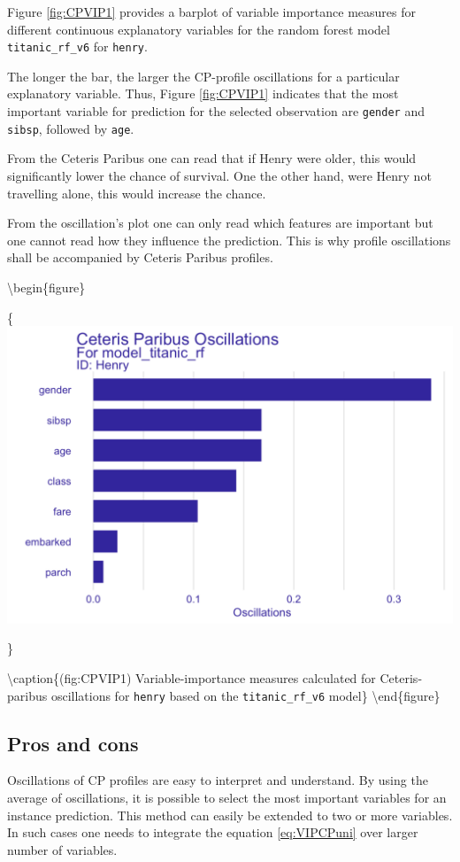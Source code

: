 \documentclass[12pt,]{krantz}
\begin{document}
Figure \ref{fig:CPVIP1} provides a barplot of variable importance measures for different continuous explanatory variables for the random forest model \texttt{titanic\_rf\_v6} for \texttt{henry}.

The longer the bar, the larger the CP-profile oscillations for a particular explanatory variable. Thus, Figure \ref{fig:CPVIP1} indicates that the most important variable for prediction for the selected observation are \texttt{gender} and \texttt{sibsp}, followed by \texttt{age}.

From the Ceteris Paribus one can read that if Henry were older, this would significantly lower the chance of survival. One the other hand, were Henry not travelling alone, this would increase the chance.

From the oscillation's plot one can only read which features are important but one cannot read how they influence the prediction. This is why profile oscillations shall be accompanied by Ceteris Paribus profiles.

\textbackslash{}begin\{figure\}

\{\centering \includegraphics[width=0.75\linewidth]{figure/oscillations_all_rf_plot}

\}

\textbackslash{}caption\{(fig:CPVIP1) Variable-importance measures calculated for Ceteris-paribus oscillations for \texttt{henry} based on the \texttt{titanic\_rf\_v6} model\}\label{fig:CPVIP1}
\textbackslash{}end\{figure\}

\hypertarget{CPOscProsCons}{%
\subsection{Pros and cons}\label{CPOscProsCons}}

Oscillations of CP profiles are easy to interpret and understand. By using the average of oscillations, it is possible to select the most important variables for an instance prediction. This method can easily be extended to two or more variables. In such cases one needs to integrate the equation \eqref{eq:VIPCPuni} over larger number of variables.
\end{document}

